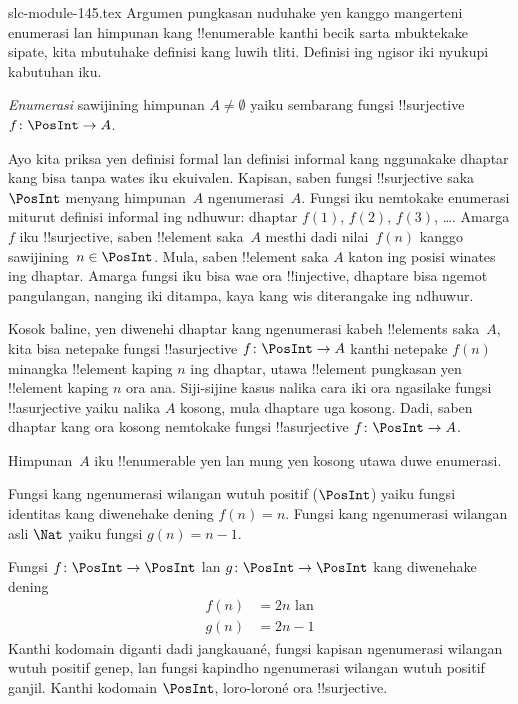 \begin{filecontents*}[overwrite]{slc-module-145.tex}
Argumen pungkasan nuduhake yen kanggo mangerteni
enumerasi lan himpunan kang !!{enumerable} kanthi becik sarta mbuktekake sipate,
kita mbutuhake definisi kang luwih tliti. Definisi ing ngisor iki nyukupi kabutuhan iku.

\begin{defn}
\emph{Enumerasi} sawijining himpunan $A \neq \emptyset$ yaiku sembarang
fungsi !!{surjective} $f \colon \PosInt \to A$.
\end{defn}

\begin{explain}
Ayo kita priksa yen definisi formal lan definisi informal kang nggunakake
dhaptar kang bisa tanpa wates iku ekuivalen. Kapisan, saben fungsi
!!{surjective} saka $\PosInt$ menyang himpunan~$A$ ngenumerasi~$A$.
Fungsi iku nemtokake enumerasi miturut definisi informal ing ndhuwur:
dhaptar $f(1)$, $f(2)$, $f(3)$, \dots. Amarga $f$ iku !!{surjective},
saben !!{element} saka~$A$ mesthi dadi nilai~$f(n)$ kanggo
sawijining~$n \in \PosInt$. Mula, saben !!{element} saka $A$ katon
ing posisi winates ing dhaptar. Amarga fungsi iku bisa wae ora
!!{injective}, dhaptare bisa ngemot pangulangan, nanging iki ditampa,
kaya kang wis diterangake ing ndhuwur.

Kosok baline, yen diwenehi dhaptar kang ngenumerasi kabeh !!{element}s
saka~$A$, kita bisa netepake fungsi !!a{surjective} $f\colon \PosInt \to A$
kanthi netepake $f(n)$ minangka !!{element} kaping $n$ ing dhaptar,
utawa !!{element} pungkasan yen !!{element} kaping $n$ ora ana.
Siji-sijine kasus nalika cara iki ora ngasilake fungsi !!a{surjective}
yaiku nalika $A$ kosong, mula dhaptare uga kosong. Dadi, saben dhaptar
kang ora kosong nemtokake fungsi !!a{surjective} $f\colon \PosInt \to A$.
\end{explain}

\begin{defn}
  Himpunan~$A$ iku !!{enumerable} yen lan mung yen kosong utawa duwe enumerasi.
\end{defn}

\begin{ex}
Fungsi kang ngenumerasi wilangan wutuh positif ($\PosInt$) yaiku
fungsi identitas kang diwenehake dening $f(n) = n$. Fungsi kang ngenumerasi
wilangan asli $\Nat$ yaiku fungsi $g(n) = n - 1$.
\end{ex}

\begin{ex}
Fungsi $f\colon \PosInt \to \PosInt$ lan $g \colon \PosInt \to
\PosInt$ kang diwenehake dening
\begin{align*}
f(n) & = 2n \text{ lan}\\
g(n) & = 2n - 1
\end{align*}
Kanthi kodomain diganti dadi jangkauané, fungsi kapisan ngenumerasi wilangan wutuh
positif genep, lan fungsi kapindho ngenumerasi wilangan wutuh positif ganjil.
Kanthi kodomain $\PosInt$, loro-loroné ora !!{surjective}.
\end{ex}


\end{filecontents*}
